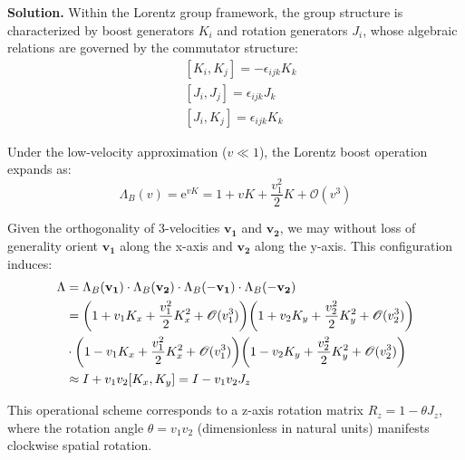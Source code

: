 \documentclass[12pt, a4paper, oneside]{article}
\newenvironment{solution}{\par\noindent\textbf{Solution. }}{\par}
\renewcommand{\vb}[1]{\ensuremath{\mathbf{#1}}}
\newcommand{\e}{\ensuremath{\mathrm{e}}}
\begin{document}
\begin{solution}
    Within the Lorentz group framework, the group structure is characterized by boost generators $K_i$ and rotation generators $J_i$, whose algebraic relations are governed by the commutator structure:
    \begin{align}
            &[K_i, K_j]=-\epsilon_{ijk} K_k\\
            &[J_i, J_j]=\epsilon_{ijk} J_k\\
            &[J_i, K_j]=\epsilon_{ijk} K_k
    \end{align}

    Under the low-velocity approximation ($v \ll 1$), the Lorentz boost operation expands as:
    \begin{equation}
        \Lambda_B(v) = \e^{vK} = 1 + vK + \frac{v_1^2}{2}K + \mathscr{O}(v^3)
    \end{equation}

    Given the orthogonality of 3-velocities \vb{v_1} and \vb{v_2}, we may without loss of generality orient \vb{v_1} along the x-axis and \vb{v_2} along the y-axis. This configuration induces:
    \begin{equation}
        \begin{split}
            \Lambda&=\Lambda_B(\vb{v_1})\cdot\Lambda_B(\vb{v_2})\cdot\Lambda_B(-\vb{v_1})\cdot\Lambda_B(-\vb{v_2})\\
                   &=\qty(1+v_1K_x+\frac{v_1^2}{2}K_x^2+\mathscr{O}(v_1^3))\qty(1+v_2K_y+\frac{v_2^2}{2}K_y^2+\mathscr{O}(v_2^3))\\
                   &\cdot\qty(1-v_1K_x+\frac{v_1^2}{2}K_x^2+\mathscr{O}(v_1^3))\qty(1-v_2K_y+\frac{v_2^2}{2}K_y^2+\mathscr{O}(v_2^3))\\
                   &\approx I+v_1v_2[K_x, K_y]=I-v_1v_2J_z
        \end{split}
    \end{equation}

    This operational scheme corresponds to a z-axis rotation matrix $R_z=1-\theta J_z$, where the rotation angle $\theta = v_1v_2$ (dimensionless in natural units) manifests clockwise spatial rotation.
\end{solution}
\end{document}
